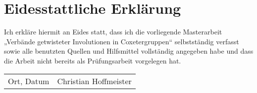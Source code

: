 \chapter*{Eidesstattliche Erklärung}

Ich erkläre hiermit an Eides statt, dass ich die vorliegende Masterarbeit „Verbände getwisteter Involutionen in Coxetergruppen“ selbstständig verfasst sowie alle benutzten Quellen und Hilfsmittel vollständig angegeben habe und dass die Arbeit nicht bereits als Prüfungsarbeit vorgelegen hat. 

\vspace*{1.75cm}

\noindent \begin{tabularx}{\linewidth}{Xr}
\hline
{\footnotesize Ort, Datum} & {\footnotesize Christian Hoffmeister} \\
\end{tabularx}